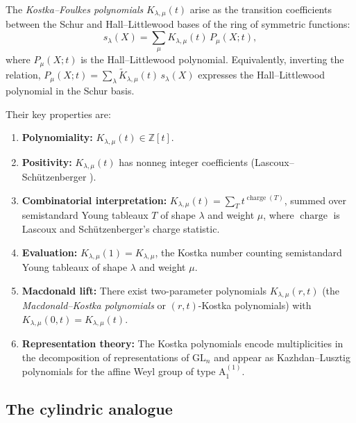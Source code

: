 \documentclass[11pt]{article}
\theoremstyle{plain}
\theoremstyle{definition}
\newcommand{\Z}{\mathbb{Z}}
\begin{document}
The \emph{Kostka--Foulkes polynomials} $K_{\lambda,\mu}(t)$
\cite{Macdonald} arise as the transition coefficients between the Schur
and Hall--Littlewood bases of the ring of symmetric functions:
\begin{equation}
  s_\lambda(X)
  = \sum_\mu K_{\lambda,\mu}(t)\, P_\mu(X;t),
  \label{eq:KF-def}
\end{equation}
where $P_\mu(X;t)$ is the Hall--Littlewood polynomial.
Equivalently, inverting the relation,
$P_\mu(X;t) = \sum_\lambda \widetilde{K}_{\lambda,\mu}(t)\, s_\lambda(X)$
expresses the Hall--Littlewood polynomial in the Schur basis.

Their key properties are:
\begin{enumerate}
  \item[(K1)] \textbf{Polynomiality:}
    $K_{\lambda,\mu}(t) \in \Z[t]$.
  \item[(K2)] \textbf{Positivity:}
    $K_{\lambda,\mu}(t)$ has nonneg integer coefficients
    (Lascoux--Sch\"utzenberger \cite{LS}).
  \item[(K3)] \textbf{Combinatorial interpretation:}
    $K_{\lambda,\mu}(t) = \sum_{T} t^{\operatorname{charge}(T)}$,
    summed over semistandard Young tableaux $T$ of shape $\lambda$
    and weight $\mu$, where $\operatorname{charge}$ is Lascoux and
    Sch\"utzenberger's charge statistic.
  \item[(K4)] \textbf{Evaluation:}
    $K_{\lambda,\mu}(1) = K_{\lambda,\mu}$, the Kostka number
    counting semistandard Young tableaux of shape $\lambda$ and
    weight $\mu$.
  \item[(K5)] \textbf{Macdonald lift:}
    There exist two-parameter polynomials $K_{\lambda,\mu}(r,t)$
    (the \emph{Macdonald--Kostka polynomials} or
    $(r,t)$-Kostka polynomials)
    with $K_{\lambda,\mu}(0,t) = K_{\lambda,\mu}(t)$.
  \item[(K6)] \textbf{Representation theory:}
    The Kostka polynomials encode multiplicities in the decomposition
    of representations of $\mathrm{GL}_n$ and appear as
    Kazhdan--Lusztig polynomials for the affine Weyl group of type
    $\mathrm{A}_1^{(1)}$.
\end{enumerate}

\subsection{The cylindric analogue}
\end{document}
